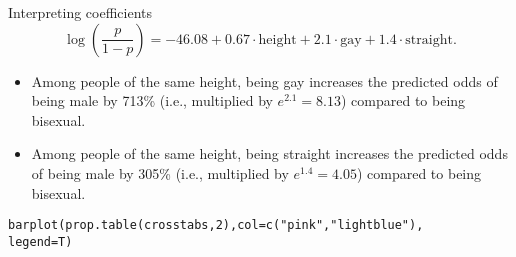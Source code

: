 \documentclass{beamer}\usepackage[]{graphicx}\usepackage[]{color}
\makeatletter
\newcommand{\hlnum}[1]{\textcolor[rgb]{0.824,0.412,0.118}{#1}}%
\newcommand{\hlstr}[1]{\textcolor[rgb]{1,0.894,0.71}{#1}}%
\newcommand{\hlopt}[1]{\textcolor[rgb]{1,0.894,0.769}{#1}}%
\newcommand{\hlstd}[1]{\textcolor[rgb]{1,0.894,0.769}{#1}}%
\newcommand{\hlkwb}[1]{\textcolor[rgb]{0.804,0.776,0.451}{#1}}%
\newcommand{\hlkwc}[1]{\textcolor[rgb]{0.78,0.941,0.545}{#1}}%
\newcommand{\hlkwd}[1]{\textcolor[rgb]{1,0.78,0.769}{#1}}%
\newenvironment{kframe}{%
 \def\at@end@of@kframe{}%
 \ifinner\ifhmode%
  \def\at@end@of@kframe{\end{minipage}}%
  \begin{minipage}{\columnwidth}%
 \fi\fi%
 \def\FrameCommand##1{\hskip\@totalleftmargin \hskip-\fboxsep
 \colorbox{shadecolor}{##1}\hskip-\fboxsep
     \hskip-\linewidth \hskip-\@totalleftmargin \hskip\columnwidth}%
 \MakeFramed {\advance\hsize-\width
   \@totalleftmargin\z@ \linewidth\hsize
   \@setminipage}}%
 {\par\unskip\endMakeFramed%
 \at@end@of@kframe}
\newenvironment{knitrout}{}{} %
\makeatother
\begin{document}
\begin{darkframes}
    \begin{frame}{Interpreting coefficients}
      \[
        \log\left(\frac{p}{1-p}\right) =
          -46.08 +
          0.67\cdot\text{height} +
          2.1\cdot\text{gay} +
          1.4\cdot\text{straight}.
      \]
      \begin{itemize}[<+->]
        \item Among people of the same height, being gay increases the predicted odds of being male by 713\% (i.e., multiplied by $e^{2.1} = 8.13$) compared to being bisexual.
        \item Among people of the same height, being straight increases the predicted odds of being male by 305\% (i.e., multiplied by $e^{1.4} = 4.05$) compared to being bisexual.
      \end{itemize}
    \end{frame}


    \begin{frame}[fragile]
      \fontsm
\begin{knitrout}
\begin{kframe}
\begin{alltt}
\hlkwd{barplot}\hlstd{(}\hlkwd{prop.table}\hlstd{(crosstabs,} \hlnum{2}\hlstd{),} \hlkwc{col}\hlstd{=}\hlkwd{c}\hlstd{(}\hlstr{"pink"}\hlstd{,} \hlstr{"lightblue"}\hlstd{),}
  \hlkwc{legend}\hlstd{=T)}
\end{alltt}
\end{kframe}


\end{knitrout}
    \end{frame}


\end{darkframes}
\end{document}
